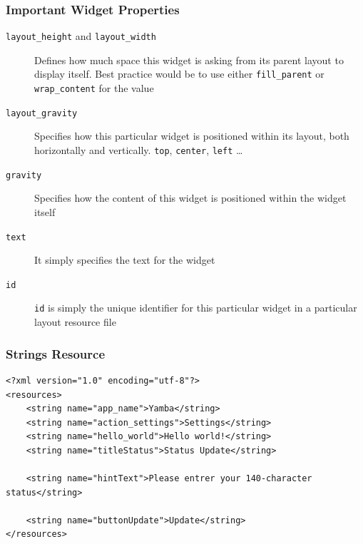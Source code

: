 \begin{frame}
\frametitle{Important Widget Properties}
\begin{description}
	\item[\texttt{layout\_height} and \texttt{layout\_width}] Defines how much space this widget is asking from its parent layout to display
itself. Best practice would be to use either \texttt{fill\_parent} or \texttt{wrap\_content} for the value
	\item[\texttt{layout\_gravity}]Specifies how this particular widget is positioned within its layout, both horizontally
and vertically. \texttt{top}, \texttt{center}, \texttt{left} \dots
	\item[\texttt{gravity}] Specifies how the content of this widget is positioned within the widget itself
	\item[\texttt{text}] It simply specifies the text for the widget
	\item[\texttt{id}] \texttt{id} is simply the unique identifier for this particular widget in a particular layout resource file
\end{description}
\end{frame}
\begin{frame}[fragile]
\frametitle{Strings Resource}
\lstset{language=XML, style=eclipse}
\begin{adjustbox}{width=1.0 \textwidth}
\centering
\begin{lstlisting}[caption=res/values/strings.xml]
<?xml version="1.0" encoding="utf-8"?>
<resources>
    <string name="app_name">Yamba</string>
    <string name="action_settings">Settings</string>
    <string name="hello_world">Hello world!</string>
    <string name="titleStatus">Status Update</string>

    <string name="hintText">Please entrer your 140-character status</string>

    <string name="buttonUpdate">Update</string>
</resources>
\end{lstlisting}
\end{adjustbox}
\end{frame}


